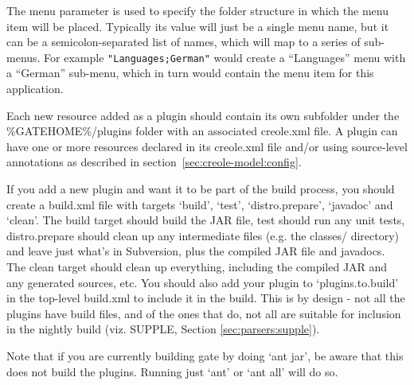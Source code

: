 The menu parameter is used to specify the folder structure in which the menu
item will be placed. Typically its value will just be a single menu name, but
it can be a semicolon-separated list of names, which will map to a series of
sub-menus.  For example \verb!"Languages;German"! would create a ``Languages''
menu with a ``German'' sub-menu, which in turn would contain the menu item
for this application.





Each new resource added as a plugin should contain its own subfolder under the
\%GATEHOME\%/plugins folder with an associated creole.xml file. A plugin can
have one or more resources declared in its creole.xml file and/or using
source-level annotations as described in section~\ref{sec:creole-model:config}.

If you add a new plugin and want it to be part of the build process, you
should create a build.xml file with targets `build', `test',
`distro.prepare', `javadoc' and `clean'.  The build target should build
the JAR file, test should run any unit tests, distro.prepare should clean up
any intermediate files (e.g. the classes/ directory) and leave just what's
in Subversion, plus the compiled JAR file and javadocs.  The clean target
should clean up everything, including the compiled JAR and any generated
sources, etc.  You should also add your plugin to
`plugins.to.build' in the top-level build.xml to include it in the
build.  This is by design - not all the plugins have build files, and of
the ones that do, not all are suitable for inclusion in the nightly
build (viz. SUPPLE, Section \ref{sec:parsers:supple}).

Note that if you are currently building gate by doing `ant jar', be aware
that this does not build the plugins.  Running just `ant' or `ant all' will
do so.


